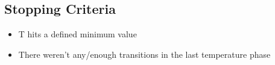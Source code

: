 \subsection{Stopping Criteria}
\begin{itemize}
    \item T hits a defined minimum value
    \item There weren't any/enough transitions in the last temperature phase
\end{itemize}
